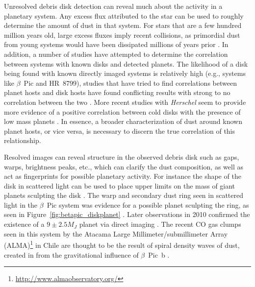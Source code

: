     Unresolved debris disk detection can reveal much about the activity in a planetary system. Any excess flux attributed to the star can be used to roughly determine the amount of dust in that system. For stars that are a few hundred million years old, large excess fluxes imply recent collisions, as primordial dust from young systems would have been dissipated millions of years prior \citep[e.g., BD+20 307;][]{Song2005}. In addition, a number of studies have attempted to determine the correlation between systems with known disks and detected planets. The likelihood of a disk being found with known directly imaged systems is relatively high (e.g., systems like $\beta$~Pic and HR~8799), studies that have tried to find correlations between planet hosts and disk hosts have found conflicting results with strong to no correlation between the two \citep[mainly seen with Spitzer studies;][]{Beichman2005, Bryden2009}. More recent studies with \textit{Herschel} seem to provide more evidence of a positive correlation between cold disks with the presence of low mass planets \citep[see references in][]{Matthews2014}. In essence, a broader characterization of dust around known planet hosts, or vice versa, is necessary to discern the true correlation of this relationship.

    Resolved images can reveal structure in the observed debris disk such as gaps, warps, brightness peaks, etc., which can clarify the dust composition, as well as act as fingerprints for possible planetary activity. For instance the shape of the disk in scattered light can be used to place upper limits on the mass of giant planets sculpting the disk \citep[e.g.,][]{Kalas2005b,Rodigas2014}. The warp and secondary dust ring seen in scattered light in the $\beta$~Pic system was evidence for a possible planet sculpting the ring, as seen in Figure~\ref{fig:betapic_diskplanet} \citep{Heap2000}. Later observations in 2010 confirmed the existence of a $9\pm2.5 M_J$ planet via direct imaging \citep{Lagrange2010, Marleau2014}. The recent CO gas clumps seen in this system by the Atacama Large Millimeter/submillimeter Array (ALMA)\footnote{\url{http://www.almaobservatory.org/}} in Chile are thought to be the result of spiral density waves of dust, created in from the gravitational influence of $\beta$~Pic~b \citep{Nesvold2015}. 


